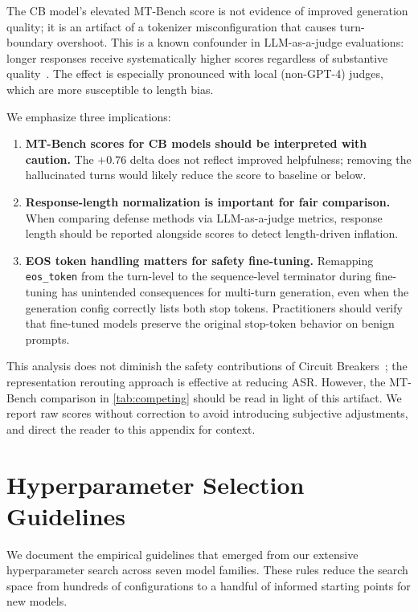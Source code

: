 The CB model's elevated MT-Bench score is not evidence of improved generation quality; it is an artifact of a tokenizer misconfiguration that causes turn-boundary overshoot. This is a known confounder in LLM-as-a-judge evaluations: longer responses receive systematically higher scores regardless of substantive quality~\citep{zheng2023judging}. The effect is especially pronounced with local (non-GPT-4) judges, which are more susceptible to length bias.

We emphasize three implications:

\begin{enumerate}[nosep,leftmargin=*]
    \item \textbf{MT-Bench scores for CB models should be interpreted with caution.} The $+0.76$ delta does not reflect improved helpfulness; removing the hallucinated turns would likely reduce the score to baseline or below.
    \item \textbf{Response-length normalization is important for fair comparison.} When comparing defense methods via LLM-as-a-judge metrics, response length should be reported alongside scores to detect length-driven inflation.
    \item \textbf{EOS token handling matters for safety fine-tuning.} Remapping \texttt{eos\_token} from the turn-level to the sequence-level terminator during fine-tuning has unintended consequences for multi-turn generation, even when the generation config correctly lists both stop tokens. Practitioners should verify that fine-tuned models preserve the original stop-token behavior on benign prompts.
\end{enumerate}

This analysis does not diminish the safety contributions of Circuit Breakers~\citep{zou2024circuitbreakers}; the representation rerouting approach is effective at reducing ASR. However, the MT-Bench comparison in \cref{tab:competing} should be read in light of this artifact. We report raw scores without correction to avoid introducing subjective adjustments, and direct the reader to this appendix for context.

\section{Hyperparameter Selection Guidelines}
\label{app:hyperparams}

We document the empirical guidelines that emerged from our extensive hyperparameter search across seven model families. These rules reduce the search space from hundreds of configurations to a handful of informed starting points for new models.

